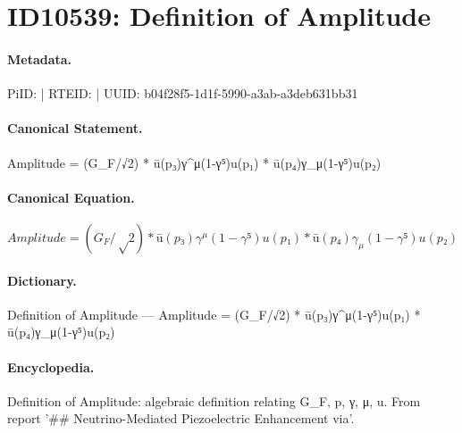 \section*{ID10539: Definition of Amplitude}
\paragraph{Metadata.}
PiID:  | RTEID:  | UUID: b04f28f5-1d1f-5990-a3ab-a3deb631bb31

\paragraph{Canonical Statement.}
Amplitude = (G\_F/√2) * ū(p₃)γ\textasciicircum{}μ(1-γ⁵)u(p₁) * ū(p₄)γ\_μ(1-γ⁵)u(p₂)

\paragraph{Canonical Equation.}
\[
Amplitude = (G_F/√2) * ū(p₃)γ^μ(1-γ⁵)u(p₁) * ū(p₄)γ_μ(1-γ⁵)u(p₂)
\]

\paragraph{Dictionary.}
Definition of Amplitude — Amplitude = (G\_F/√2) * ū(p₃)γ\textasciicircum{}μ(1-γ⁵)u(p₁) * ū(p₄)γ\_μ(1-γ⁵)u(p₂)

\paragraph{Encyclopedia.}
Definition of Amplitude: algebraic definition relating G\_F, p, γ, μ, u. From report '\#\# Neutrino-Mediated Piezoelectric Enhancement via'.
